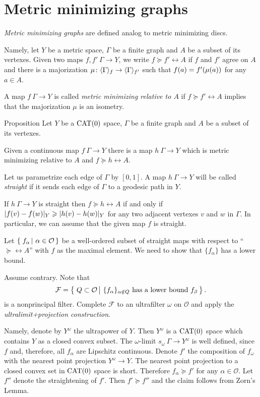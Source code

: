 \section{Metric minimizing graphs}\label{Metric minimizing graphs}

\emph{Metric minimizing graphs} are defined analog to metric minimizing discs.

Namely, let $Y$ be a metric space, $\Gamma$ be a finite graph and $A$ be a subset of its vertexes.
Given two maps $f,f'\:\Gamma\to Y$, we write $f\succcurlyeq f'\rel A$ if $f$ and $f'$ agree on $A$ 
and there is a majorization $\mu\colon\langle\Gamma\rangle_f\to \langle\Gamma\rangle_{f'}$
such that $f(a)\zz=f'(\mu(a))$ for any $a\in A$.

A map $f\:\Gamma\to Y$ is called \emph{metric minimizing relative to $A$} if $f\succcurlyeq f'\rel A$ implies that the majorization $\mu$ is an isometry.

\begin{thm}{Proposition}\label{prop:metric-min-graph-exist}
Let $Y$ be a $\mathop{\rm CAT}\nolimits(0)$ space, 
$\Gamma$ be a finite graph and $A$ be a subset of its vertexes.

Given a continuous map $f\:\Gamma\to Y$ there is a map $h\:\Gamma\to Y$ 
which is metric minimizing relative to $A$ and $f\succcurlyeq h\rel A$.
\end{thm}

Let us parametrize each edge of $\Gamma$ by $[0,1]$.
A map $h\:\Gamma\to Y$ will be called \emph{straight} if it
sends each edge of $\Gamma$ to a geodesic path in $Y$.

If $h\:\Gamma\to Y$ is straight then $f\succcurlyeq h\rel A$ if and only if 
$|f(v)-f(w)|_Y\zz\ge |h(v)-h(w)|_Y$
for any two adjacent vertexes $v$ and $w$ in $\Gamma$.
In particular, we can assume that the given map $f$ is straight.

Let $\set{f_\alpha}{\alpha\in \mathcal{O}}$ be a well-ordered subset of straight maps with respect to ``$\succcurlyeq\rel A$'' 
with $f$ as the maximal element. 
We need to show that $\{f_\alpha\}$ has a lower bound.

Assume contrary.
Note that
$$
\mathcal{F}
=
\set{Q\subset\mathcal{O}}{\{f_\alpha\}_{\alpha\notin Q}\text{ has a lower bound } f_\beta}.
$$
is a nonprincipal filter.
Complete $\mathcal{F}$ to an ultrafilter $\omega$ on $\mathcal{O}$ and apply the \emph{ultralimit+projection construction}.

Namely, denote by $Y^\omega$ the ultrapower of $Y$. 
Then $Y^\omega$
is a $\mathop{\rm CAT}\nolimits(0)$ space which contains $Y$ as a closed convex subset. 
The $\omega$-limit $s_\omega\:\Gamma\to Y^\omega$ is well defined, since
$f$ and, therefore, all $f_\alpha$ are Lipschitz continuous. 
Denote $f'$ the composition of $f_\omega$ with the nearest point projection $Y^\omega\to Y$.
The nearest point projection to a closed convex set in $\mathop{\rm CAT}\nolimits(0)$ space is short.
Therefore $f_\alpha\succcurlyeq f'$ for any $\alpha\in \mathcal{O}$. Let $f''$ denote the straightening of $f'$.
Then $f'\succcurlyeq f''$ and the claim follows from Zorn's Lemma.
\qeds


